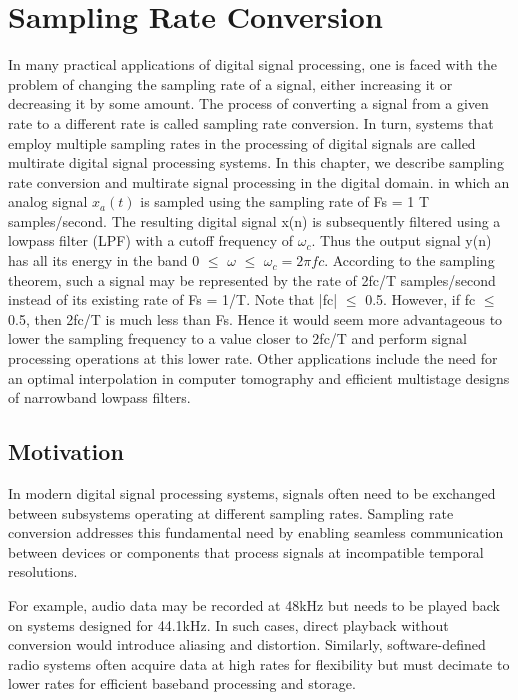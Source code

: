 \documentclass{article}
\begin{document}
\section{Sampling Rate Conversion}
In many practical applications of digital signal processing, one is faced
with the problem of changing the sampling rate of a signal, either increasing it or decreasing it by some amount. The process of converting a signal
from a given rate to a different rate is called sampling rate conversion.
In turn, systems that employ multiple sampling rates in the processing
of digital signals are called multirate digital signal processing systems. In
this chapter, we describe sampling rate conversion and multirate signal
processing in the digital domain.  in which
an analog signal $x_a(t)$ is sampled using the sampling rate of Fs = 1
T
samples/second. The resulting digital signal x(n) is subsequently filtered
using a lowpass filter (LPF) with a cutoff frequency of $\omega_c$.
Thus the output signal y(n) has all its energy in the band 0 $\leq$ $\omega$ $\leq$
$\omega_c = 2\pi fc$. According to the sampling theorem, such a signal may be represented by the rate of 2fc/T samples/second instead of its existing rate
of Fs = 1/T. Note that |fc| $\leq$ 0.5. However, if fc $\leq $ 0.5, then 2fc/T is much less than Fs.
Hence it would seem more advantageous to lower the sampling frequency
to a value closer to 2fc/T and perform signal processing operations at
this lower rate.
Other applications include the need for an optimal interpolation in
computer tomography and efficient multistage designs of narrowband lowpass filters.

\subsection{Motivation}
In modern digital signal processing systems, signals often need to be exchanged between subsystems operating at different sampling rates. Sampling rate conversion addresses this fundamental need by enabling seamless communication between devices or components that process signals at incompatible temporal resolutions.

For example, audio data may be recorded at 48kHz but needs to be played back on systems designed for 44.1kHz. In such cases, direct playback without conversion would introduce aliasing and distortion. Similarly, software-defined radio systems often acquire data at high rates for flexibility but must decimate to lower rates for efficient baseband processing and storage.
\end{document}
